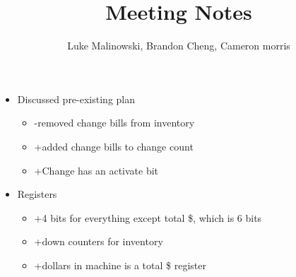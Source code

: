 \documentclass{article}
\title{Meeting Notes}
\author{Luke Malinowski, Brandon Cheng, Cameron morris}
\begin{document}
\maketitle
\begin{itemize}
\item{Discussed pre-existing plan}
\begin{itemize}
\item{-removed change bills from inventory}
\item{+added change bills to change count}
\item{+Change has an activate bit}
\end{itemize}
\item{Registers}
\begin{itemize}
\item{+4 bits for everything except total \$, which is 6 bits}
\item{+down counters for inventory}
\item{+dollars in machine is a total \$ register}
\end{itemize}
\end{itemize}
\end{document}
